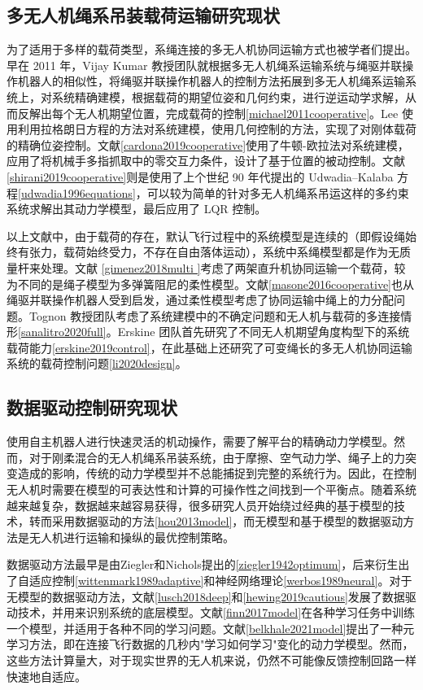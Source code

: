 \documentclass[lang=chs, degree=master, blindreview=false, winfonts=true]{yanputhesis}
\begin{document}
\subsection{多无人机绳系吊装载荷运输研究现状}
为了适用于多样的载荷类型，系绳连接的多无人机协同运输方式也被学者们提出。早在 2011 年，Vijay Kumar 教授团队就根据多无人机绳系运输系统与绳驱并联操作机器人的相似性，将绳驱并联操作机器人的控制方法拓展到多无人机绳系运输系统上，对系统精确建模，根据载荷的期望位姿和几何约束，进行逆运动学求解，从而反解出每个无人机期望位置，完成载荷的控制\ref{michael2011cooperative}。Lee 使用利用拉格朗日方程的方法对系统建模，使用几何控制的方法，实现了对刚体载荷的精确位姿控制。文献\ref{cardona2019cooperative}使用了牛顿-欧拉法对系统建模，应用了将机械手多指抓取中的零交互力条件，设计了基于位置的被动控制。文献\ref{shirani2019cooperative}则是使用了上个世纪 90 年代提出的 Udwadia–Kalaba 方程\ref{udwadia1996equations}，可以较为简单的针对多无人机绳系吊运这样的多约束系统求解出其动力学模型，最后应用了 LQR 控制。

以上文献中，由于载荷的存在，默认飞行过程中的系统模型是连续的（即假设绳始终有张力，载荷始终受力，不存在自由落体运动），系统中系绳模型都是作为无质量杆来处理。文献 \ref{gimenez2018multi }考虑了两架直升机协同运输一个载荷，较为不同的是绳子模型为多弹簧阻尼的柔性模型。文献\ref{masone2016cooperative}也从绳驱并联操作机器人受到启发，通过柔性模型考虑了协同运输中绳上的力分配问题。Tognon 教授团队考虑了系统建模中的不确定问题和无人机与载荷的多连接情形\ref{sanalitro2020full}。Erskine 团队首先研究了不同无人机期望角度构型下的系统载荷能力\ref{erskine2019control}，在此基础上还研究了可变绳长的多无人机协同运输系统的载荷控制问题\ref{li2020design}。


\subsection{数据驱动控制研究现状}
使用自主机器人进行快速灵活的机动操作，需要了解平台的精确动力学模型。然而，对于刚柔混合的无人机绳系吊装系统，由于摩擦、空气动力学、绳子上的力突变造成的影响，传统的动力学模型并不总能捕捉到完整的系统行为。因此，在控制无人机时需要在模型的可表达性和计算的可操作性之间找到一个平衡点。随着系统越来越复杂，数据越来越容易获得，很多研究人员开始绕过经典的基于模型的技术，转而采用数据驱动的方法\ref{hou2013model}，而无模型和基于模型的数据驱动方法是无人机进行运输和操纵的最优控制策略。

数据驱动方法最早是由Ziegler和Nichols提出的\ref{ziegler1942optimum}，后来衍生出了自适应控制\ref{wittenmark1989adaptive}和神经网络理论\ref{werbos1989neural}。对于无模型的数据驱动方法，文献\ref{lusch2018deep}和\ref{hewing2019cautious}发展了数据驱动技术，并用来识别系统的底层模型。文献\ref{finn2017model}在各种学习任务中训练一个模型，并适用于各种不同的学习问题。文献\ref{belkhale2021model}提出了一种元学习方法，即在连接飞行数据的几秒内"学习如何学习"变化的动力学模型。然而，这些方法计算量大，对于现实世界的无人机来说，仍然不可能像反馈控制回路一样快速地自适应。
\end{document}
